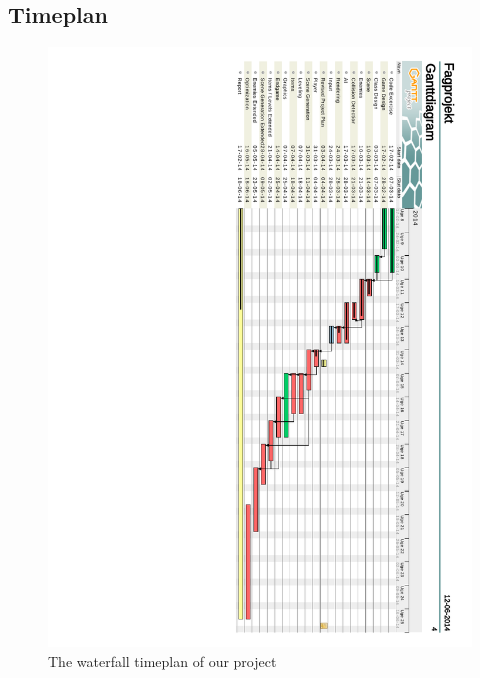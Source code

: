 \documentclass[12pt]{report}
\begin{document}
\subsection*{Timeplan}
\begin{figure}[h]
  \centering
  \includegraphics[scale=0.55]{Figures/Tidsplan2}
  \caption{The waterfall timeplan of our project}
  \label{fig:Waterfall_chart}
\end{figure}
\end{document}

